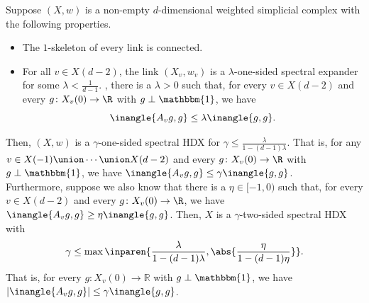 \documentclass{toc}
\begin{document}
\begin{dtheorem}\label{thm:td-full}
  Suppose $(X,w)$ is a non-empty $d$-dimensional weighted simplicial complex with the following properties.
  \begin{itemize}\itemsep0pt
  \item The $1$-skeleton of every link is connected.
  \item For all $v \in X(d-2)$, the link $(X_v,w_v)$ is a
    $\lambda$-one-sided spectral expander for some $\lambda < \frac1{d-1}$. \Ie, there is a $\lambda > 0$ such that, for every $v \in X(d-2)$ and every $g\colon X_v(0) \rightarrow \R$ with $g \perp \mathbbm{1}$, we have
  \[
\inangle{A_v g,g} \leq \lambda \inangle{g,g}.
  \]

  \end{itemize}
Then, $(X,w)$ is a $\gamma$-one-sided spectral HDX for $\gamma \leq \frac{\lambda}{1 - (d-1)\lambda}$. That is, for any $v \in X(-1) \union \cdots \union X(d-2)$ and every $g\colon X_v(0) \rightarrow \R$ with $g \perp \mathbbm{1}$, we have $\inangle{A_v g,g} \leq \gamma \inangle{g,g}$.\\
  

Furthermore, suppose we also know that there is a $\eta \in [-1,0)$ such that, for every $v \in X(d-2)$ and every $g\colon X_v(0) \rightarrow \R$, we have $\inangle{A_v g,g} \geq \eta \inangle{g,g}$. Then, $X$ is a $\gamma$-two-sided spectral HDX with 
\[
  \gamma \leq \max\inparen{\frac{\lambda}{1 - (d-1)\lambda}, \abs{\frac{\eta}{1 - (d-1)\eta}}}.
\]
That is, for every $g \colon X_v(0) \rightarrow \mathbb{R}$ with $g
\perp \mathbbm{1}$, we have $|\inangle{A_v g,g} | \leq \gamma \inangle{g,g}$.
\end{dtheorem}
\end{document}
